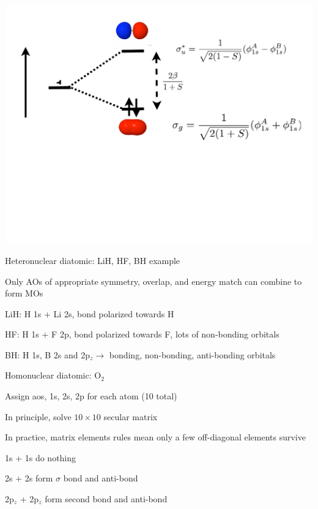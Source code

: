\message{ !name(Outline.tex)}\documentclass[11pt]{article}
\begin{document}
\begin{outline}
\begin{outline}
\begin{outline}
\begin{center}
     \includegraphics[scale=0.25]{Images/H2-MO}       
     \end{center}
   \end{outline}
 \item Heteronuclear diatomic: LiH, HF, BH example
   \begin{outline}
   \item Only AOs of appropriate symmetry, overlap, and energy match can
     combine to form MOs
   \item LiH: H 1s + Li 2s, bond polarized towards H
   \item HF: H 1s + F 2p, bond polarized towards F, lots of non-bonding orbitals
   \item BH: H 1s, B 2s and 2p$_z \rightarrow$ bonding, non-bonding, anti-bonding orbitals
   \end{outline}
 \item Homonuclear diatomic: O$_2$
   \begin{outline}
   \item Assign aos, 1s, 2s, 2p for each atom (10 total)
   \item In principle, solve $10\times 10$ secular matrix
   \item In practice, matrix elements rules mean only a few off-diagonal
     elements survive
     \begin{outline}
     \item 1s + 1s do nothing
     \item 2s + 2s form $\sigma$ bond and anti-bond
     \item 2p$_z$ + 2p$_z$ form second bond and anti-bond

\end{outline}
\end{outline}
\end{outline}
\end{outline}
\end{document}
